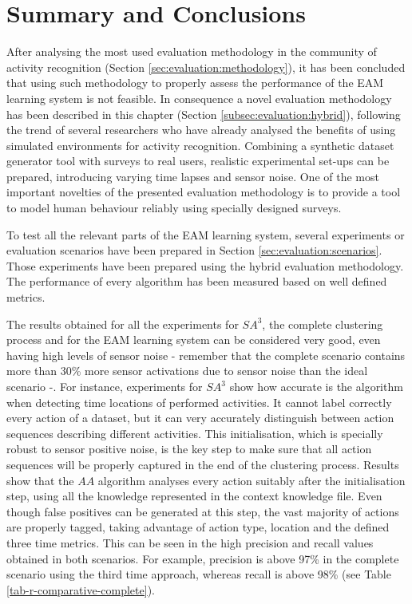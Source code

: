 \section{Summary and Conclusions}
\label{sec:evaluation:conclusions}

After analysing the most used evaluation methodology in the community of activity recognition (Section \ref{sec:evaluation:methodology}), it has been concluded that using such methodology to properly assess the performance of the EAM learning system is not feasible. In consequence a novel evaluation methodology has been described in this chapter (Section \ref{subsec:evaluation:hybrid}), following the trend of several researchers who have already analysed the benefits of using simulated environments for activity recognition. Combining a synthetic dataset generator tool with surveys to real users, realistic experimental set-ups can be prepared, introducing varying time lapses and sensor noise. One of the most important novelties of the presented evaluation methodology is to provide a tool to model human behaviour reliably using specially designed surveys. 

To test all the relevant parts of the EAM learning system, several experiments or evaluation scenarios have been prepared in Section \ref{sec:evaluation:scenarios}. Those experiments have been prepared using the hybrid evaluation methodology. The performance of every algorithm has been measured based on well defined metrics.

The results obtained for all the experiments for $SA^3$, the complete clustering process and for the EAM learning system can be considered very good, even having high levels of sensor noise - remember that the complete scenario contains more than 30\% more sensor activations due to sensor noise than the ideal scenario -. For instance, experiments for $SA^3$ show how accurate is the algorithm when detecting time locations of performed activities. It cannot label correctly every action of a dataset, but it can very accurately distinguish between action sequences describing different activities. This initialisation, which is specially robust to sensor positive noise, is the key step to make sure that all action sequences will be properly captured in the end of the clustering process. Results show that the $AA$ algorithm analyses every action suitably after the initialisation step, using all the knowledge represented in the context knowledge file. Even though false positives can be generated at this step, the vast majority of actions are properly tagged, taking advantage of action type, location and the defined three time metrics. This can be seen in the high precision and recall values obtained in both scenarios. For example, precision is above 97\% in the complete scenario using the third time approach, whereas recall is above 98\% (see Table \ref{tab-r-comparative-complete}). 


